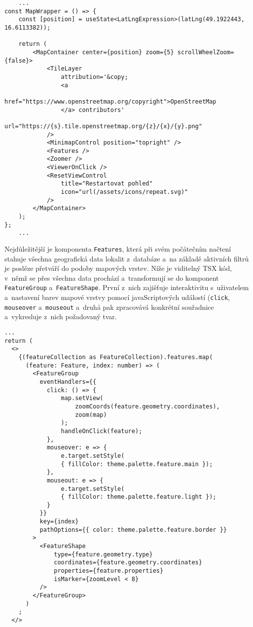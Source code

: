 \begin{verbatim}
    ...
const MapWrapper = () => {
    const [position] = useState<LatLngExpression>(latLng(49.1922443, 16.6113382));

    return (
        <MapContainer center={position} zoom={5} scrollWheelZoom={false}>
            <TileLayer
                attribution='&copy;
                <a
                href="https://www.openstreetmap.org/copyright">OpenStreetMap
                </a> contributors'
                url="https://{s}.tile.openstreetmap.org/{z}/{x}/{y}.png"
            />
            <MinimapControl position="topright" />
            <Features />
            <Zoomer />
            <ViewerOnClick />
            <ResetViewControl
                title="Restartovat pohled"
                icon="url(/assets/icons/repeat.svg)"
            />
        </MapContainer>
    );
};
    ...
    \end{verbatim}

Nejdůležitější je komponenta \verb|Features|, která při svém počátečním načtení stahuje všechna geografická data lokalit z~databáze a~na základě aktivních filtrů je posléze přetváří do podoby mapových vrstev. Níže je viditelný TSX kód, v~němž se přes všechna data prochází a~transformují se do komponent \verb|FeatureGroup| a~\verb|FeatureShape|. První z~nich zajišťuje interaktivitu s~uživatelem a~nastavení barev mapové vrstvy pomocí javaScriptových událostí (\verb|click|, \verb|mouseover| a~\verb|mouseout| a~druhá pak zpracovává konkrétní souřadnice a~vykresluje z~nich požadovaný tvar.

\begin{verbatim}
...
return (
  <>
    {(featureCollection as FeatureCollection).features.map(
      (feature: Feature, index: number) => (
        <FeatureGroup
          eventHandlers={{
            click: () => {
                map.setView(
                    zoomCoords(feature.geometry.coordinates),
                    zoom(map)
                );
                handleOnClick(feature);
            },
            mouseover: e => {
                e.target.setStyle(
                { fillColor: theme.palette.feature.main });
            },
            mouseout: e => {
                e.target.setStyle(
                { fillColor: theme.palette.feature.light });
            }
          }}
          key={index}
          pathOptions={{ color: theme.palette.feature.border }}
        >
          <FeatureShape
              type={feature.geometry.type}
              coordinates={feature.geometry.coordinates}
              properties={feature.properties}
              isMarker={zoomLevel < 8}
          />
        </FeatureGroup>
      )
    ;
  </>
\end{verbatim}
